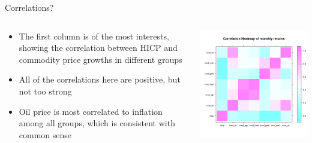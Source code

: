     \begin{frame}{Correlations?}
        \begin{columns}
        \begin{column}{0.5\textwidth}
        \begin{itemize}
            \item<1-> The first column is of the most interests, showing the correlation between HICP and commodity price growths in different groups
            \item<2-> All of the correlations here are positive, but not too strong
            \item<3-> Oil price is most correlated to inflation among all groups, which is consistent with common sense
        \end{itemize}
        \end{column}
        \begin{column}{0.5\textwidth}  %
            \begin{center}
             \includegraphics[width=\textwidth]{../../figures/heatmapcmd.png}
             \end{center}
        \end{column}
        \end{columns}
    \end{frame}


